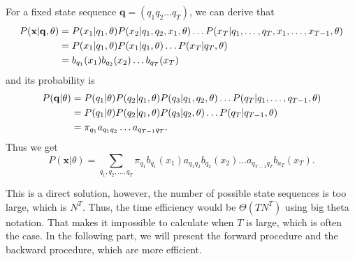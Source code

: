 \documentclass[12pt,final,twoside]{report}
\theoremstyle{plain}
\theoremstyle{definition}
\theoremstyle{remark}
\begin{document}
For a fixed state sequence $\mathbf{q} = (q_1 q_2 \dots q_T)$, we can derive that
\begin{align}
  P(\mathbf{x}|\mathbf{q},\theta) &= P(x_1|q_1,\theta) P(x_2|q_1,q_2,x_1,\theta) \dots P(x_T|q_1,\dots,q_T,x_1,\dots,x_{T-1},\theta) \notag\\
  &= P(x_1|q_1, \theta) P(x_1|q_1, \theta) \dots P(x_T|q_T, \theta) \notag\\
  &= b_{q_1}(x_1) b_{q_2}(x_2) \dots b_{q_T}(x_T)
\end{align}
and its probability is
\begin{align}
  P(\mathbf{q}|\theta) &= P(q_1|\theta) P(q_2|q_1,\theta) P(q_3|q_1,q_2,\theta) \dots P(q_T|q_1,\dots,q_{T-1},\theta) \notag\\
  &= P(q_1|\theta) P(q_2|q_1,\theta) P(q_3|q_2,\theta) \dots P(q_T|q_{T-1},\theta)  \notag\\
  &= \pi_{q_1} a_{q_1q_2} \dots a_{q_{T-1}q_T} .
\end{align}
Thus we get 
\begin{equation}
  P(\mathbf{x}|\theta) = \sum_{q_1,q_2,\dots,q_T} \pi_{q_1} b_{q_1}(x_1) a_{q_1q_2} b_{q_2}(x_2) \dots a_{q_{T-1}q_T} b_{a_T}(x_T) .
  \label{eq:prob_brute}
\end{equation}

This is a direct solution, however, the number of possible state sequences is too large, which is $N^T$. Thus, the time efficiency would be $\Theta(T N^T)$ using big theta notation. That makes it impossible to calculate when $T$ is large, which is often the case. In the following part, we will present the forward procedure and the backward procedure, which are more efficient.
\end{document}
